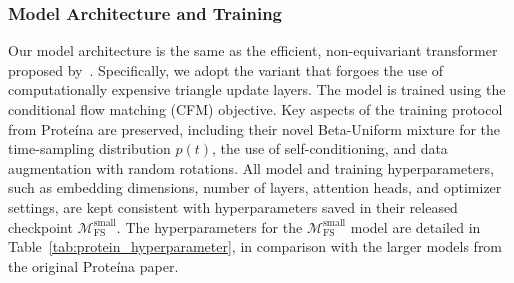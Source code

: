 \subsubsection{Model Architecture and Training}
\label{appx:protein_model}
Our model architecture is the same as the efficient, non-equivariant transformer proposed by~\citep{geffner2025proteina}. Specifically, we adopt the variant that forgoes the use of computationally expensive triangle update layers.
The model is trained using the conditional flow matching (CFM) objective.
Key aspects of the training protocol from Prote\'ina are preserved, including their novel Beta-Uniform mixture for the time-sampling distribution $p(t)$, the use of self-conditioning, and data augmentation with random rotations.
All model and training hyperparameters, such as embedding dimensions, number of layers, attention heads, and optimizer settings, are kept consistent with hyperparameters saved in their released checkpoint $\mathcal{M}_{\text{FS}}^{\text{small}}$.
The hyperparameters for the $\mathcal{M}_{\text{FS}}^{\text{small}}$ model are detailed in Table~\ref{tab:protein_hyperparameter}, in comparison with the larger models from the original Proteína paper.

